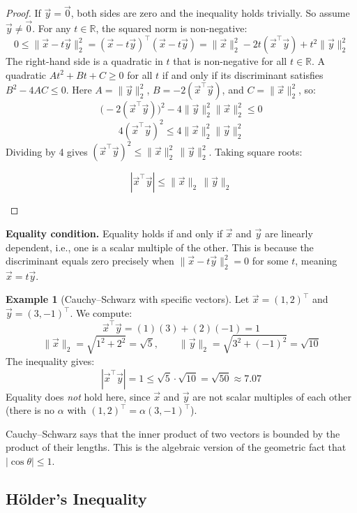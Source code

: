 \documentclass[10pt, twocolumn]{article}
\theoremstyle{definition}
\newtheorem{example}{Example}
\theoremstyle{plain}
\newcommand{\RR}{\mathbb{R}}
\begin{document}
\begin{proof}
If $\vec{y} = \vec{0}$, both sides are zero and the inequality holds trivially. So assume $\vec{y} \ne \vec{0}$. For any $t \in \RR$, the squared norm is non-negative:
\[
    0 \le \|\vec{x} - t\vec{y}\|_2^2 = (\vec{x} - t\vec{y})^\top(\vec{x} - t\vec{y}) = \|\vec{x}\|_2^2 - 2t(\vec{x}^\top \vec{y}) + t^2 \|\vec{y}\|_2^2
\]
The right-hand side is a quadratic in $t$ that is non-negative for all $t \in \RR$. A quadratic $At^2 + Bt + C \ge 0$ for all $t$ if and only if its discriminant satisfies $B^2 - 4AC \le 0$. Here $A = \|\vec{y}\|_2^2$, $B = -2(\vec{x}^\top \vec{y})$, and $C = \|\vec{x}\|_2^2$, so:
\[
    \bigl(-2(\vec{x}^\top \vec{y})\bigr)^2 - 4\|\vec{y}\|_2^2 \|\vec{x}\|_2^2 \le 0
\]
\[
    4(\vec{x}^\top \vec{y})^2 \le 4\|\vec{x}\|_2^2 \|\vec{y}\|_2^2
\]
Dividing by 4 gives $(\vec{x}^\top \vec{y})^2 \le \|\vec{x}\|_2^2 \, \|\vec{y}\|_2^2$. Taking square roots:
\begin{result}
\[
    |\vec{x}^\top \vec{y}| \le \|\vec{x}\|_2 \, \|\vec{y}\|_2
\]
\end{result}
\end{proof}

\textbf{Equality condition.} Equality holds if and only if $\vec{x}$ and $\vec{y}$ are linearly dependent, i.e., one is a scalar multiple of the other. This is because the discriminant equals zero precisely when $\|\vec{x} - t\vec{y}\|_2^2 = 0$ for some $t$, meaning $\vec{x} = t\vec{y}$.

\begin{example}[Cauchy--Schwarz with specific vectors]
Let $\vec{x} = (1, 2)^\top$ and $\vec{y} = (3, -1)^\top$. We compute:
\[
    \vec{x}^\top \vec{y} = (1)(3) + (2)(-1) = 1
\]
\[
    \|\vec{x}\|_2 = \sqrt{1^2 + 2^2} = \sqrt{5}, \qquad \|\vec{y}\|_2 = \sqrt{3^2 + (-1)^2} = \sqrt{10}
\]
The inequality gives:
\[
    |\vec{x}^\top \vec{y}| = 1 \le \sqrt{5} \cdot \sqrt{10} = \sqrt{50} \approx 7.07
\]
Equality does \emph{not} hold here, since $\vec{x}$ and $\vec{y}$ are not scalar multiples of each other (there is no $\alpha$ with $(1, 2)^\top = \alpha(3, -1)^\top$).
\end{example}

Cauchy--Schwarz says that the inner product of two vectors is bounded by the product of their lengths. This is the algebraic version of the geometric fact that $|\cos\theta| \le 1$.

\subsection{H\"{o}lder's Inequality}
\end{document}
